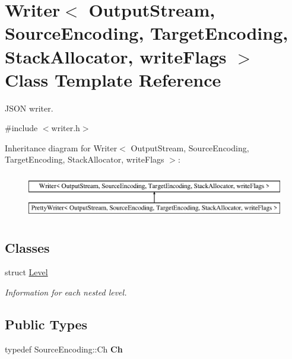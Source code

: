 \hypertarget{a02224}{}\section{Writer$<$ Output\+Stream, Source\+Encoding, Target\+Encoding, Stack\+Allocator, write\+Flags $>$ Class Template Reference}
\label{a02224}


J\+S\+ON writer.  




{\ttfamily \#include $<$writer.\+h$>$}

Inheritance diagram for Writer$<$ Output\+Stream, Source\+Encoding, Target\+Encoding, Stack\+Allocator, write\+Flags $>$\+:\begin{figure}[H]
\begin{center}
\leavevmode
\includegraphics[height=2.000000cm]{a02224}
\end{center}
\end{figure}
\subsection*{Classes}
\begin{DoxyCompactItemize}
\item 
struct \hyperlink{a02428}{Level}
\begin{DoxyCompactList}\small\item\em Information for each nested level. \end{DoxyCompactList}\end{DoxyCompactItemize}
\subsection*{Public Types}
\begin{DoxyCompactItemize}
\item 
\mbox{\label{a02224_ab08bff5fd2daec65f4a78779ca3d2139}} 
typedef Source\+Encoding\+::\+Ch {\bfseries Ch}
\end{DoxyCompactItemize}
